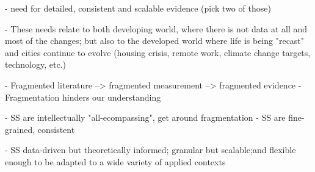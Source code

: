 









- need for detailed, consistent and scalable evidence (pick two of those)

- These needs relate to both developing world, where there is not data at all
  and most of the changes; but also to the developed world where life is being
  "recast" and cities continue to evolve (housing crisis, remote work, climate
  change targets, technology, etc.)

- Fragmented literature --> fragmented measurement --> fragmented evidence
- Fragmentation hinders our understanding

- SS are intellectually "all-ecompassing", get around fragmentation
- SS are fine-grained, consistent

- SS data-driven but theoretically informed; granular but scalable;and flexible enough to be adapted to a wide variety of applied contexts


